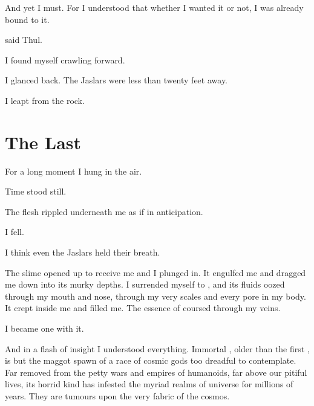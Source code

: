 \documentclass
  [a4paper,
   12pt,
   oneside
  ]%
  {article}
\begin{document}
And yet I must. 
For I understood that whether I wanted it or not, I was already bound to it. 

 said Thul.

I found myself crawling forward.



I glanced back.
The Jaslars were less than twenty feet away. 


I leapt from the rock. 









\section{The Last \Arcanum}
For a long moment I hung in the air. 

Time stood still. 

The flesh rippled underneath me as if in anticipation. 

I fell. 

I think even the Jaslars held their breath. 

The slime opened up to receive me and I plunged in.
It engulfed me and dragged me down into its murky depths.
I surrended myself to \Ubloth, and its fluids oozed through my mouth and nose, through my very scales and every pore in my body.
It crept inside me and filled me. 
The essence of \Ubloth coursed through my veins.

I became one with it. 

And in a flash of insight I understood everything. 
Immortal \Ubloth, older than the first \dragon, is but the maggot spawn of a race of cosmic gods too dreadful to contemplate. 
Far removed from the petty wars and empires of humanoids, far above our pitiful lives, its horrid kind has infested the myriad realms of universe for millions of years. 
They are tumours upon the very fabric of the cosmos. 
\end{document}
